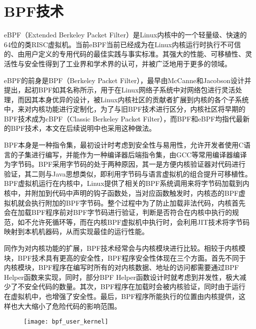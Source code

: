 \section{BPF技术}


eBPF（Extended Berkeley Packet Filter）是Linux内核中的一个轻量级、快速的64位的类RISC虚拟机\citep{sharaf2022extended}。当前eBPF当前已经成为在Linux内核运行时执行不可信的、由用户定义的专用代码的最佳实践与事实标准。其强大的性能、可移植性、灵活性与安全性得到了工业界和学术界的认可，并被广泛地用于更多的领域。

eBPF的前身是BPF（Berkeley Packet Filter），最早由McCanne和Jacobson设计并提出\citep{mccanne1993bsd}，起初BPF如其名称所示，用于在Linux网络子系统中对网络包进行灵活处理，而因其本身优异的设计，被Linux内核社区的贡献者扩展到内核的各个子系统中，来对内核功能进行定制化，为了与旧BPF技术进行区分，内核社区将早期的BPF技术成为cBPF（Classic Berkeley Packet Filter），而BPF和eBPF均指代最新的BPF技术，本文在后续说明中也采用这种做法。

BPF本身是一种指令集，最初设计时考虑到安全性与易用性，允许开发者使用C语言的子集进行编写，并能作为一种编译器后端指令集，由GCC等常用编译器编译为字节码\citep{ebpfguidence}。BPF采用字节码的处于两种原因，其一是方便内核验证器对代码进行验证，其二则与Java思想类似，即利用字节码与语言虚拟机的组合提升可移植性。BPF虚拟机运行在内核中，Linux提供了相关的BPF系统调用来将字节码加载到内核中，并附加到代码中声明的钩子函数处，当对应函数触发时，内核态的BPF虚拟机就会执行附加的BPF字节码。整个过程中为了防止加载非法代码，内核首先会在加载BPF程序前对BPF字节码进行验证，判断是否符合在内核中执行的规范，如不允许死循环等，而在内核BPF虚拟机中执行时，会利用JIT技术将字节码映射到本机机器码，从而实现最佳的运行性能。

同作为对内核功能的扩展，BPF技术经常会与内核模块进行比较。相较于内核模块，BPF技术具有更高的安全性，BPF程序安全性体现在三个方面。首先不同于内核模块，BPF程序在编写时所有的对内核数据、地址的访问都需要通过BPF Helper函数来实现，同时，部分BPF Helper函数设计时就考虑到并发性，极大减少了不安全代码的数量。其次，BPF程序在加载时会被内核验证，同时由于运行在虚拟机中，也增强了安全性。最后，BPF程序所能执行的位置由内核提供，这样也大大缩小了危险代码的影响范围。

\begin{figure}[!htbp]
    \centering
    \texttt{[image: bpf\_user\_kernel]}
    \label{fig:bpf_user_kernel}
\end{figure}

